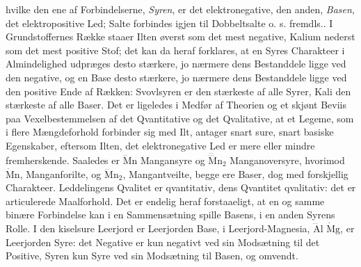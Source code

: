 \documentclass[12pt,a4paper]{book}
\begin{document}
hvilke den ene af Forbindelserne, \emph{Syren}, er det elektronegative,
den anden, \emph{Basen}, det elektropositive Led; Salte forbindes igjen
til Dobbeltsalte o. s. fremdls.. I Grundstoffernes Række staaer Ilten
øverst som det mest negative, Kalium nederst som det mest positive Stof;
det kan da heraf forklares, at en Syres Charakteer i Almindelighed
udpræges desto stærkere, jo nærmere dens Bestanddele ligge ved den
negative, og en Base desto stærkere, jo nærmere dens Bestanddele ligge ved
den positive Ende af Rækken: Svovlsyren er den stærkeste af alle Syrer,
Kali den stærkeste af alle Baser. Det er ligeledes i Medfør af Theorien og
et skjønt Beviis paa Vexelbestemmelsen af det Qvantitative og det
Qvalitative, at et Legeme, som i flere Mængdeforhold forbinder sig med
Ilt, antager snart sure, snart basiske Egenskaber, eftersom Ilten, det
elektronegative Led er mere eller
mindre fremherskende. Saaledes er $\dddot{\mathrm{M}}\mathrm{n}$ Mangansyre og
$\dddot{\ddddot{\mathrm{M}}}\!\mathrm{n}_2$ Manganoversyre, hvorimod
$\dot{\mathrm{M}}\mathrm{n}$, Manganforilte, og $\dddot{\mathrm{M}}\mathrm{n}_2$,
Mangantveilte, begge ere Baser, dog med forskjellig Charakteer.
Leddelingens Qvalitet er qvantitativ, dens Qvantitet qvalitativ: det er
articulerede Maalforhold. Det er endelig heraf forstaaeligt, at en og
samme binære Forbindelse kan i en Sammensætning spille Basens, i en anden
Syrens Rolle. I den kiselsure Leerjord er Leerjorden Base, i
Leerjord-Magnesia, $\dddot{\mathrm{A}}\mathrm{l}$ $\dot{\mathrm{M}}\mathrm{g}$, er
Leerjorden Syre: det Negative er kun negativt ved sin Modsætning til det
Positive, Syren kun Syre ved sin Modsætning til Basen, og omvendt.
\end{document}
